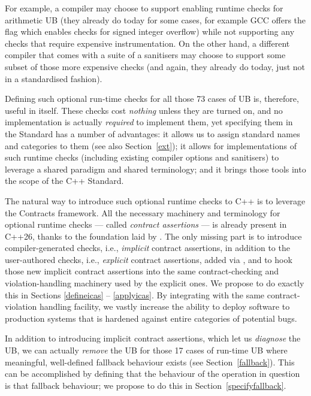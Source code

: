 For example, a compiler may choose to support enabling runtime checks for arithmetic UB (they already do today for some cases, for example GCC offers the  flag which enables checks for signed integer overflow) while not supporting any checks that require expensive instrumentation. On the other hand, a different compiler that comes with a suite of a sanitisers may choose to support some subset of those more expensive checks (and again, they already do today, just not in a standardised fashion).

Defining such optional run-time checks for all those 73 cases of UB is, therefore, useful in itself. These checks cost \emph{nothing} unless they are turned on, and no implementation is actually \emph{required} to implement them, yet specifying them in the Standard has a number of advantages: it allows us to assign standard names and categories to them (see also Section~\ref{ext}); it allows for implementations of such runtime checks (including existing compiler options and sanitisers) to leverage a shared paradigm and shared terminology; and it brings those tools into the scope of the C++ Standard.

The natural way to introduce such optional runtime checks to C++ is to leverage the Contracts framework. All the necessary machinery and terminology for optional runtime checks --- called \emph{contract assertions} --- is already present in C++26, thanks to the foundation laid by \cite{P2900R14}. The only missing part is to introduce compiler-generated checks, i.e., \emph{implicit} contract assertions, in addition to the user-authored checks, i.e., \emph{explicit} contract assertions,  added via \cite{P2900R14}, and to hook those new implicit contract assertions into the same contract-checking and violation-handling machinery used by the explicit ones. We propose to do exactly this in Sections \ref{defineicas} -- \ref{applyicas}. By integrating with the same contract-violation handling facility, we vastly increase the ability to deploy software to production systems that is hardened against entire categories of potential bugs.

In addition to introducing implicit contract assertions, which let us \emph{diagnose} the UB, we can actually \emph{remove} the UB for those 17 cases of run-time UB where meaningful, well-defined fallback behaviour exists (see Section~\ref{fallback}). This can be accomplished by defining that the behaviour of the operation in question is that fallback behaviour; we propose to do this in Section~\ref{specifyfallback}.

